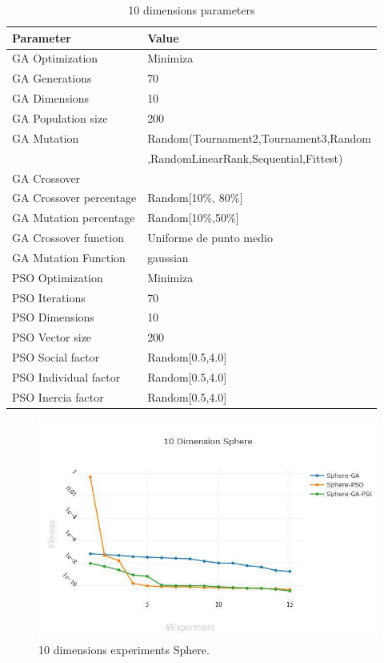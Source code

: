 \documentclass[runningheads]{llncs}
\begin{document}
    \begin{table}[htp]
      \caption{10 dimensions parameters}
      \label{table:ga-pso-parameters-10}
      \centering
      \begin{tabular}{|l|l|}
      \hline
      Parameter & Value \\
      \hline
      \hline
      GA Optimization & Minimiza \\
      \hline
GA Generations & 70 \\
      \hline
GA Dimensions & 10 \\
      \hline
GA Population size & 200 \\
      \hline
GA Mutation & Random(Tournament2,Tournament3,Random \\
      &  ,RandomLinearRank,Sequential,Fittest)\\
      \hline
GA Crossover \\
      \hline
GA Crossover percentage & Random[10\%, 80\%] \\
      \hline
GA Mutation percentage & Random[10\%,50\%] \\
      \hline
GA Crossover function & Uniforme de punto medio \\
      \hline
GA Mutation Function & gaussian \\
      \hline
PSO Optimization & Minimiza \\
      \hline
PSO Iterations & 70 \\
      \hline
PSO Dimensions & 10 \\
      \hline
PSO Vector size & 200 \\
      \hline
PSO Social factor & Random[0.5,4.0] \\
      \hline
PSO Individual factor & Random[0.5,4.0] \\
      \hline
PSO Inercia factor & Random[0.5,4.0] \\
      \hline
      \end{tabular}
      \end{table}
    
      \begin{figure}[htp]
        \includegraphics[width=\textwidth]{img/10-sphere.jpg}
        \caption{10 dimensions experiments Sphere.} \label{fig1}
        \end{figure}
\end{document}
